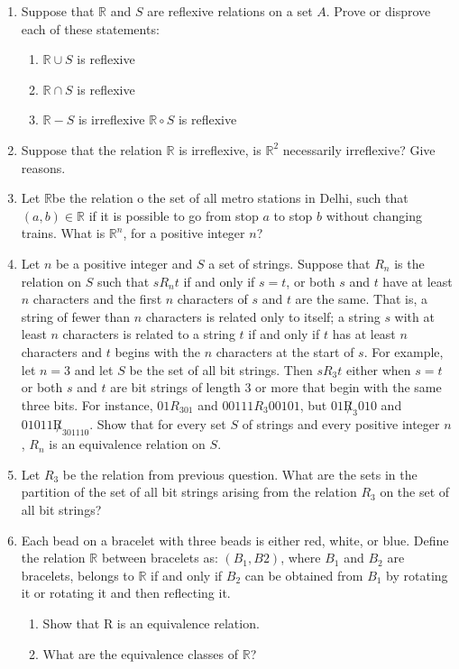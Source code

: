 \documentclass[a4paper]{article}
\begin{document}
\begin{enumerate}
\item Suppose that $\mathbb{R}$ and $S$ are reflexive relations on a set $A$. Prove or disprove each of these statements:
\begin{enumerate}
\item $\mathbb{R} \cup S$ is reflexive
\item $\mathbb{R} \cap S$ is reflexive
\item $\mathbb{R} - S$ is irreflexive
$\mathbb{R} \circ S$ is reflexive
\end{enumerate}

\item Suppose that the relation $\mathbb{R}$ is irreflexive, is $\mathbb{R}^2$ necessarily irreflexive? Give reasons.

\item Let $\mathbb{R}$be the relation o the set of all metro stations in Delhi, such that $(a,b) \in \mathbb{R}$ if it is possible to go from stop $a$ to stop $b$ without changing trains. What is $\mathbb{R}^n$, for a positive integer $n$?

\item Let $n$ be a positive integer and $S$ a set of strings. Suppose that 
$R_n$ is the relation on $S$ such
that $sR_nt$ if and only if $s = t$, or both $s$ and $t$ have at least $n$ characters and the first $n$ characters
of $s$ and $t$ are the same. That is, a string of fewer than $n$ characters is related only to itself; a string $s$ with at least $n$ characters is related to a string $t$ if and only if $t$ has at least $n$ characters
and $t$ begins with the $n$ characters at the start of $s$. For example, let $n = 3$ and let $S$ be the set
of all bit strings. Then $sR_3t$ either when $s = t$ or both $s$ and $t$ are bit strings of length 3 or more
that begin with the same three bits. For instance, $01R_301$ and $00111R_3 00101$, but $01\not R_3 010$
and $01011\not  R_301110$.
Show that for every set $S$ of strings and every positive integer $n$, $R_n$ is an equivalence
relation on $S$.



\item Let $R_3$ be the relation from previous question. What are the sets in the partition of the set of all bit strings
arising from the relation $R_3$ on the set of all bit strings? 


\item Each bead on a bracelet with three beads is either red,
white, or blue. Define the relation $\mathbb{R}$ between bracelets as: $(B_1,B2)$,
where $B_1$ and $B_2$ are bracelets, belongs to $\mathbb{R}$ if and only
if $B_2$ can be obtained from $B_1$ by rotating it or rotating it
and then reflecting it.
\begin{enumerate}
\item Show that R is an equivalence relation.
\item What are the equivalence classes of $\mathbb{R}$?
\end{enumerate}


\end{enumerate}
\end{document}

